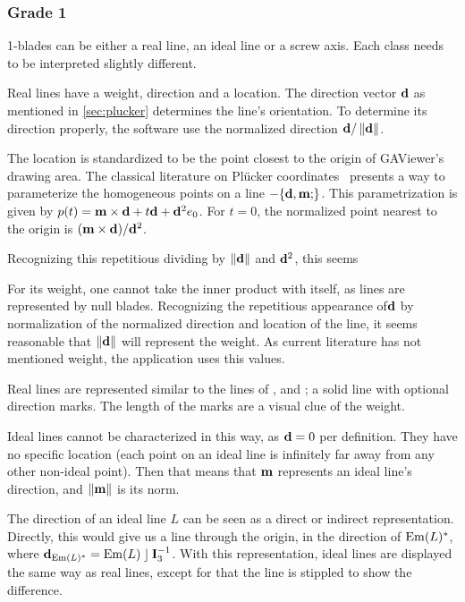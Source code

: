 \subsubsection{Grade 1}
1-blades can be either a real line, an ideal line or a screw axis.  Each class needs to be interpreted slightly different.

Real lines have a weight, direction and a location.  The direction vector $\mathbf{d}$ as mentioned in \autoref{sec:plucker} determines the line's orientation.  To determine its direction properly, the software use the normalized direction $\mathbf{d} / \left\|\mathbf{d}\right\|$.

The location is standardized to be the point closest to the origin of GAViewer's drawing area.  The classical literature on Pl\"ucker coordinates~\cite{Shoemake} presents a way to parameterize the homogeneous points on a line $-\plucker{\V{d}, \V{m}}$.  This parametrization is given by $p(t) = \mathbf{m} \times \mathbf{d} + t \mathbf{d} + \mathbf{d}^2e_0$.  For $t = 0$, the normalized point nearest to the origin is $(\mathbf{m} \times \mathbf{d}) / \mathbf{d}^2$.

Recognizing this repetitious dividing by $\left\|\mathbf{d}\right\|$ and $\mathbf{d}^2$, this seems

For its weight, one cannot take the inner product with itself, as lines are represented by null blades.  Recognizing the repetitious appearance of$\mathbf{d}$ by normalization of the normalized direction and location of the line, it seems reasonable that $\left\|\mathbf{d}\right\|$ will represent the weight.  As current literature has not mentioned weight, the application uses this values.

Real lines are represented similar to the lines of \pga, \cga and \cbga; a solid line with optional direction marks.  The length of the marks are a visual clue of the weight.

Ideal lines cannot be characterized in this way, as $\mathbf{d} = 0$ per definition.  They have no specific location (each point on an ideal line is infinitely far away from any other non-ideal point).  Then that means that $\mathbf{m}$ represents an ideal line's direction, and $\left\|\mathbf{m}\right\|$ is its norm.

The direction of an ideal line $L$ can be seen as a direct or indirect representation.  Directly, this would give us a line through the origin, in the direction of $\operatorname{Em}(L)^\ast$, where $\mathbf{d}_{\operatorname{Em}(L)^\ast} = \operatorname{Em}(L) \mathbin{\rfloor} \mathbf{I}_3^{-1}$.  With this representation, ideal lines are displayed the same way as real lines, except for that the line is stippled to show the difference. 

